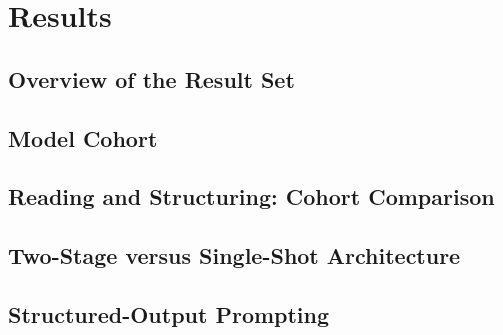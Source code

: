 \chapter{Results}
\label{ch:results}


\section{Overview of the Result Set}
\label{sec:res-overview}

\section{Model Cohort}
\label{sec:res-cohort}

\section{Reading and Structuring: Cohort Comparison}
\label{sec:res-cohort-comparison}

\section{Two-Stage versus Single-Shot Architecture}
\label{sec:res-architecture}

\section{Structured-Output Prompting}
\label{sec:res-structured}

